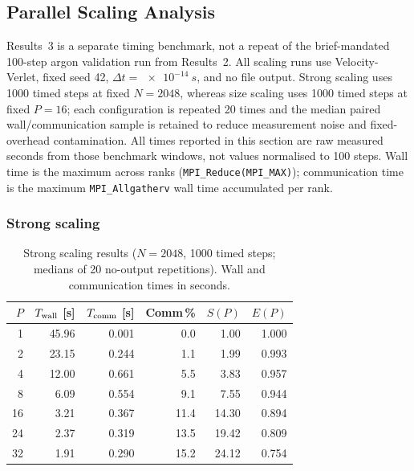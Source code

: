 \documentclass[10pt,twocolumn]{article}
\begin{document}
\subsection{Parallel Scaling Analysis}
\label{sec:scaling}

Results~3 is a separate timing benchmark, not a repeat of the brief-mandated 100-step argon validation run from Results~2.
All scaling runs use Velocity-Verlet, fixed seed 42,
$\Delta t=\SI{e-14}{s}$, and no file output.
Strong scaling uses 1000 timed steps at fixed $N=2048$, whereas size scaling uses 1000 timed steps at fixed $P=16$; each configuration is repeated 20 times and the median paired wall/communication sample is retained to reduce measurement noise and fixed-overhead contamination.
All times reported in this section are raw measured seconds from those benchmark windows, not values normalised to 100 steps.
Wall time is the maximum across ranks (\texttt{MPI\_Reduce(MPI\_MAX)});
communication time is the maximum \texttt{MPI\_Allgatherv} wall time
accumulated per rank.

\subsubsection*{Strong scaling}

\begin{table}[ht]
  \centering
  \caption{Strong scaling results ($N=2048$, 1000 timed steps; medians of 20 no-output repetitions).
    Wall and communication times in seconds.}
  \label{tab:strong}
  \small\setlength{\tabcolsep}{3pt}
  \begin{tabular}{@{}rrrrrr@{}}
    \toprule
    $P$ & $T_{\rm wall}$ [s] & $T_{\rm comm}$ [s] & Comm\,\% & $S(P)$ & $E(P)$ \\
    \midrule
     1 & 45.96 & 0.001 &  0.0 &  1.00 & 1.000 \\
     2 & 23.15 & 0.244 &  1.1 &  1.99 & 0.993 \\
     4 & 12.00 & 0.661 &  5.5 &  3.83 & 0.957 \\
     8 &  6.09 & 0.554 &  9.1 &  7.55 & 0.944 \\
    16 &  3.21 & 0.367 & 11.4 & 14.30 & 0.894 \\
    24 &  2.37 & 0.319 & 13.5 & 19.42 & 0.809 \\
    32 &  1.91 & 0.290 & 15.2 & 24.12 & 0.754 \\
    \bottomrule
  \end{tabular}
\end{table}
\end{document}
